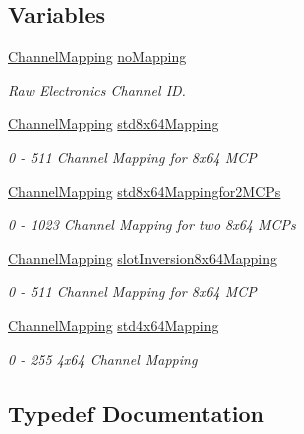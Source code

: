 \subsection*{Variables}
\begin{DoxyCompactItemize}
\item 
\hyperlink{namespacechlmap_a5bb86fec567a6f1a0646881a9284bb01}{Channel\+Mapping} \hyperlink{namespacechlmap_adeefba45d9765c580e5f7ef9cb99acc5}{no\+Mapping}
\begin{DoxyCompactList}\small\item\em Raw Electronics Channel ID. \end{DoxyCompactList}\item 
\hyperlink{namespacechlmap_a5bb86fec567a6f1a0646881a9284bb01}{Channel\+Mapping} \hyperlink{namespacechlmap_a11d7121de30a32ead9032c59221b7442}{std8x64\+Mapping}
\begin{DoxyCompactList}\small\item\em 0 -\/ 511 Channel Mapping for 8x64 M\+CP \end{DoxyCompactList}\item 
\hyperlink{namespacechlmap_a5bb86fec567a6f1a0646881a9284bb01}{Channel\+Mapping} \hyperlink{namespacechlmap_ae2a84ef16a6ad086ad62d389f29fd63a}{std8x64\+Mappingfor2\+M\+C\+Ps}
\begin{DoxyCompactList}\small\item\em 0 -\/ 1023 Channel Mapping for two 8x64 M\+C\+Ps \end{DoxyCompactList}\item 
\hyperlink{namespacechlmap_a5bb86fec567a6f1a0646881a9284bb01}{Channel\+Mapping} \hyperlink{namespacechlmap_addbd4a4856137809b06e1bffd39e2897}{slot\+Inversion8x64\+Mapping}
\begin{DoxyCompactList}\small\item\em 0 -\/ 511 Channel Mapping for 8x64 M\+CP \end{DoxyCompactList}\item 
\hyperlink{namespacechlmap_a5bb86fec567a6f1a0646881a9284bb01}{Channel\+Mapping} \hyperlink{namespacechlmap_a8acaf58562324b3f691a218f08c7afe4}{std4x64\+Mapping}
\begin{DoxyCompactList}\small\item\em 0 -\/ 255 4x64 Channel Mapping \end{DoxyCompactList}\end{DoxyCompactItemize}


\subsection{Typedef Documentation}
\mbox{\label{namespacechlmap_a5bb86fec567a6f1a0646881a9284bb01}} 
